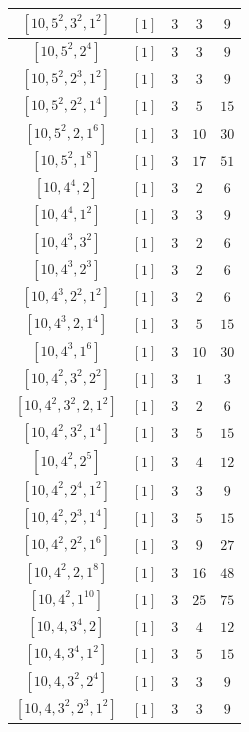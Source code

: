 \documentclass{article}%
\begin{document}
\begin{center}
\begin{longtable}{||c|c|c|c|c||}
$[10, 5^{2}, 3^{2}, 1^{2}]$ & $[1]$ & $3$ & $3$ & $9$ \\ \hline 
$[10, 5^{2}, 2^{4}]$ & $[1]$ & $3$ & $3$ & $9$ \\ \hline 
$[10, 5^{2}, 2^{3}, 1^{2}]$ & $[1]$ & $3$ & $3$ & $9$ \\ \hline 
$[10, 5^{2}, 2^{2}, 1^{4}]$ & $[1]$ & $3$ & $5$ & $15$ \\ \hline 
$[10, 5^{2}, 2, 1^{6}]$ & $[1]$ & $3$ & $10$ & $30$ \\ \hline 
$[10, 5^{2}, 1^{8}]$ & $[1]$ & $3$ & $17$ & $51$ \\ \hline 
$[10, 4^{4}, 2]$ & $[1]$ & $3$ & $2$ & $6$ \\ \hline 
$[10, 4^{4}, 1^{2}]$ & $[1]$ & $3$ & $3$ & $9$ \\ \hline 
$[10, 4^{3}, 3^{2}]$ & $[1]$ & $3$ & $2$ & $6$ \\ \hline 
$[10, 4^{3}, 2^{3}]$ & $[1]$ & $3$ & $2$ & $6$ \\ \hline 
$[10, 4^{3}, 2^{2}, 1^{2}]$ & $[1]$ & $3$ & $2$ & $6$ \\ \hline 
$[10, 4^{3}, 2, 1^{4}]$ & $[1]$ & $3$ & $5$ & $15$ \\ \hline 
$[10, 4^{3}, 1^{6}]$ & $[1]$ & $3$ & $10$ & $30$ \\ \hline 
$[10, 4^{2}, 3^{2}, 2^{2}]$ & $[1]$ & $3$ & $1$ & $3$ \\ \hline 
$[10, 4^{2}, 3^{2}, 2, 1^{2}]$ & $[1]$ & $3$ & $2$ & $6$ \\ \hline 
$[10, 4^{2}, 3^{2}, 1^{4}]$ & $[1]$ & $3$ & $5$ & $15$ \\ \hline 
$[10, 4^{2}, 2^{5}]$ & $[1]$ & $3$ & $4$ & $12$ \\ \hline 
$[10, 4^{2}, 2^{4}, 1^{2}]$ & $[1]$ & $3$ & $3$ & $9$ \\ \hline 
$[10, 4^{2}, 2^{3}, 1^{4}]$ & $[1]$ & $3$ & $5$ & $15$ \\ \hline 
$[10, 4^{2}, 2^{2}, 1^{6}]$ & $[1]$ & $3$ & $9$ & $27$ \\ \hline 
$[10, 4^{2}, 2, 1^{8}]$ & $[1]$ & $3$ & $16$ & $48$ \\ \hline 
$[10, 4^{2}, 1^{10}]$ & $[1]$ & $3$ & $25$ & $75$ \\ \hline 
$[10, 4, 3^{4}, 2]$ & $[1]$ & $3$ & $4$ & $12$ \\ \hline 
$[10, 4, 3^{4}, 1^{2}]$ & $[1]$ & $3$ & $5$ & $15$ \\ \hline 
$[10, 4, 3^{2}, 2^{4}]$ & $[1]$ & $3$ & $3$ & $9$ \\ \hline 
$[10, 4, 3^{2}, 2^{3}, 1^{2}]$ & $[1]$ & $3$ & $3$ & $9$ \\ \hline 

\end{longtable}
\end{center}
\end{document}
